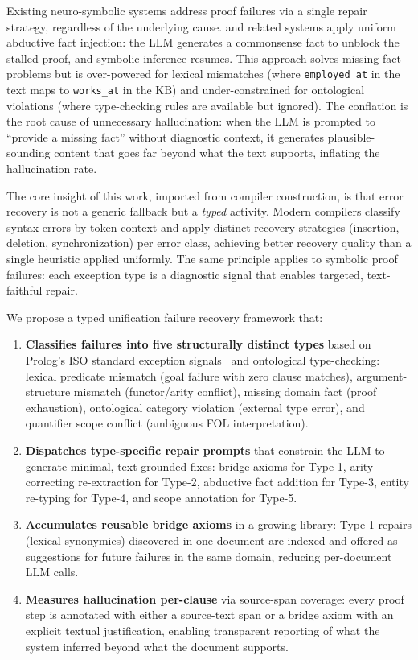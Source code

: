 \documentclass[11pt,letterpaper]{article}
\begin{document}
Existing neuro-symbolic systems address proof failures via a single repair strategy,
regardless of the underlying cause. \citet{Olausson2023} and related systems apply
uniform abductive fact injection: the LLM generates a commonsense fact to unblock
the stalled proof, and symbolic inference resumes. This approach solves missing-fact
problems but is over-powered for lexical mismatches (where \texttt{employed\_at} in
the text maps to \texttt{works\_at} in the KB) and under-constrained for ontological
violations (where type-checking rules are available but ignored). The conflation is
the root cause of unnecessary hallucination: when the LLM is prompted to ``provide a
missing fact'' without diagnostic context, it generates plausible-sounding content
that goes far beyond what the text supports, inflating the hallucination rate.

The core insight of this work, imported from compiler construction, is that error
recovery is not a generic fallback but a \emph{typed} activity. Modern compilers
classify syntax errors by token context and apply distinct recovery strategies
(insertion, deletion, synchronization) per error class, achieving better recovery
quality than a single heuristic applied uniformly. The same principle applies to
symbolic proof failures: each exception type is a diagnostic signal that enables
targeted, text-faithful repair.

We propose a typed unification failure recovery framework that:

\begin{enumerate}
\item \textbf{Classifies failures into five structurally distinct types} based on
  Prolog's ISO standard exception signals~\citep{ISO2012} and ontological
  type-checking: lexical predicate mismatch (goal failure with zero clause matches),
  argument-structure mismatch (functor/arity conflict), missing domain fact (proof
  exhaustion), ontological category violation (external type error), and quantifier
  scope conflict (ambiguous FOL interpretation).

\item \textbf{Dispatches type-specific repair prompts} that constrain the LLM to
  generate minimal, text-grounded fixes: bridge axioms for Type-1, arity-correcting
  re-extraction for Type-2, abductive fact addition for Type-3, entity re-typing for
  Type-4, and scope annotation for Type-5.

\item \textbf{Accumulates reusable bridge axioms} in a growing library: Type-1
  repairs (lexical synonymies) discovered in one document are indexed and offered as
  suggestions for future failures in the same domain, reducing per-document LLM
  calls.

\item \textbf{Measures hallucination per-clause} via source-span coverage: every
  proof step is annotated with either a source-text span or a bridge axiom with an
  explicit textual justification, enabling transparent reporting of what the system
  inferred beyond what the document supports.
\end{enumerate}
\end{document}
